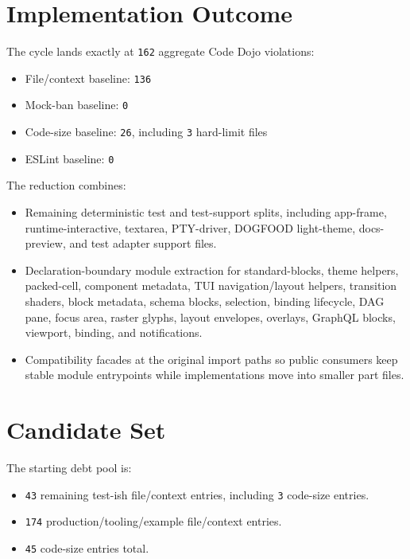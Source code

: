 \section{Implementation Outcome}\label{record-244-implementation-outcome}

The cycle lands exactly at \texttt{1\allowbreak{}6\allowbreak{}2} aggregate Code Dojo violations:

\begin{itemize}
\tightlist
\item
  File/context baseline: \texttt{1\allowbreak{}3\allowbreak{}6}
\item
  Mock-ban baseline: \texttt{0}
\item
  Code-size baseline: \texttt{2\allowbreak{}6}, including \texttt{3} hard-limit files
\item
  ESLint baseline: \texttt{0}
\end{itemize}

The reduction combines:

\begin{itemize}
\tightlist
\item
  Remaining deterministic test and test-support splits, including app-frame, runtime-interactive, textarea, PTY-driver, DOGFOOD light-theme, docs-preview, and test adapter support files.
\item
  Declaration-boundary module extraction for standard-blocks, theme helpers, packed-cell, component metadata, TUI navigation/layout helpers, transition shaders, block metadata, schema blocks, selection, binding lifecycle, DAG pane, focus area, raster glyphs, layout envelopes, overlays, GraphQL blocks, viewport, binding, and notifications.
\item
  Compatibility facades at the original import paths so public consumers keep stable module entrypoints while implementations move into smaller part files.
\end{itemize}

\section{Candidate Set}\label{record-244-candidate-set}

The starting debt pool is:

\begin{itemize}
\tightlist
\item
  \texttt{4\allowbreak{}3} remaining test-ish file/context entries, including \texttt{3} code-size entries.
\item
  \texttt{1\allowbreak{}7\allowbreak{}4} production/tooling/example file/context entries.
\item
  \texttt{4\allowbreak{}5} code-size entries total.
\end{itemize}

